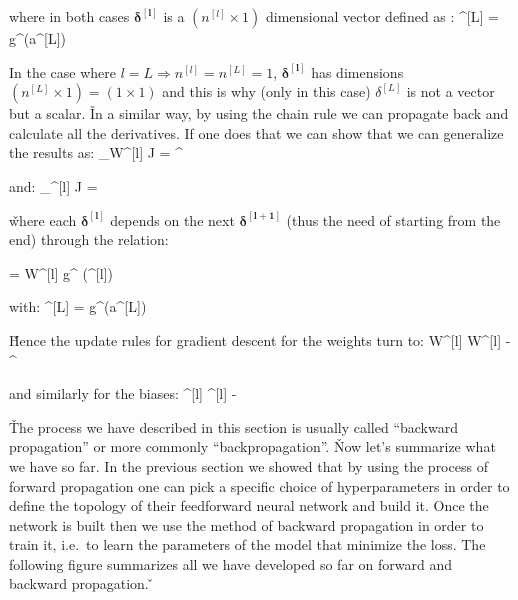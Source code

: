 \vspace{-10pt}

where in both cases $\boldsymbol{\delta^{[l]}}$ is a $(n^{[l]} \times 1)$ dimensional vector defined as :
\bse
\delta^{[L]} =  \cdot g^\prime (a^{[L]})
\ese

In the case where $l = L \Rightarrow n^{[l]} = n^{[L]} = 1$, $\boldsymbol{\delta^{[l]}}$ has dimensions $(n^{[L]}
\times 1) = (1 \times 1)$ and this is why (only in this case) $\delta^{[L]}$ is not a vector but a scalar. \v

In a similar way, by using the chain rule we can propagate back and calculate all the derivatives. If one does that
we can show that we can generalize the results as:
\bse
\nabla_{W^{[l]}} J =\boldsymbol{\delta^{[l]}} ^{\intercal}
\ese

and:
\bse
\nabla_{^{[l]}} J = \boldsymbol{\delta^{[l]}}
\ese

\v

where each $\boldsymbol{\delta^{[l]}}$ depends on the next $\boldsymbol{\delta^{[l+1]}}$ (thus the need of starting
from the end) through the relation:

\bse
\boldsymbol{\delta^{[l]}} = \boldsymbol{\delta^{[l+1]}} \cdot W^{[l]} \cdot g^{\prime} ({}^{[l]})
\ese

with:
\bse
\delta^{[L]} =  \cdot g^\prime (a^{[L]})
\ese

\v

Hence the update rules for gradient descent for the weights turn to:
\bse
W^{[l]} \coloneqq W^{[l]} - \alpha \cdot\boldsymbol{\delta^{[l]}} ^{\intercal}
\ese

and similarly for the biases:
\bse
{}^{[l]} \coloneqq {}^{[l]} -\alpha \cdot\boldsymbol{\delta^{[l]}}
\ese

\v

The process we have described in this section is usually called ``backward propagation'' or more commonly
``backpropagation''. \v

Now let's summarize what we have so far. In the previous section we showed that by using the process of forward
propagation one can pick a specific choice of hyperparameters in order to define the topology of their feedforward
neural network and build it. Once the network is built then we use the method of backward propagation in order to
train it, i.e.\ to learn the parameters of the model that minimize the loss. The following figure summarizes all we
have developed so far on forward and backward propagation. \v

